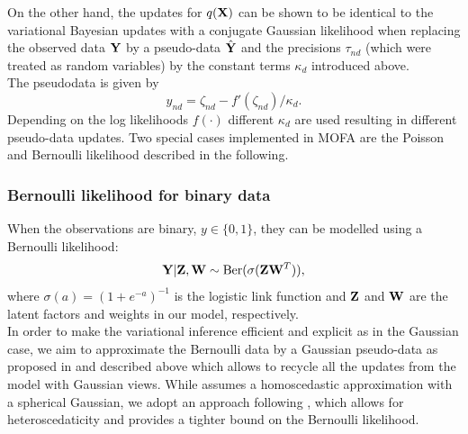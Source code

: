 On the other hand, the updates for $q({\bf X})$ can be shown to be identical to the variational Bayesian updates with a conjugate Gaussian likelihood when replacing the observed data ${\bf Y}$ by a pseudo-data $\hat{{\bf Y}}$ and the precisions $\tau_{nd}$ (which were treated as random variables) by the constant terms $\kappa_d$ introduced above.\\
The pseudodata is given by
\begin{equation*}
\hat{y}_{nd} = \zeta_{nd} - f'(\zeta_{nd})/\kappa_d.
\end{equation*}
Depending on the log likelihoods $f(\cdot)$ different $\kappa_d$ are used resulting in different pseudo-data updates. Two special cases implemented in MOFA are the Poisson and Bernoulli likelihood described in the following.

\subsubsection*{Bernoulli likelihood for binary data}
When the observations are binary, $y \in \{0,1\}$, they can be modelled using a Bernoulli likelihood:
\begin{equation*}
{\bf Y}|{\bf Z},{\bf W} \sim \text{Ber}(\sigma({\bf Z}{\bf W}^T)),
\end{equation*} where $\sigma(a)=(1+e^{-a})^{-1}$ is the logistic link function and ${\bf Z}$ and ${\bf W}$ are the latent factors and weights in our model, respectively.\\
In order to make the variational  inference efficient and explicit as in the Gaussian case, we aim to approximate the Bernoulli data by a Gaussian pseudo-data as proposed in \cite{seeger} and described above which allows to recycle all the updates from the model with Gaussian views. While \cite{seeger} assumes a homoscedastic approximation with a spherical Gaussian, we adopt an approach following \cite{Jaakkola}, which allows for heteroscedaticity and provides a tighter bound on the Bernoulli likelihood.\\
